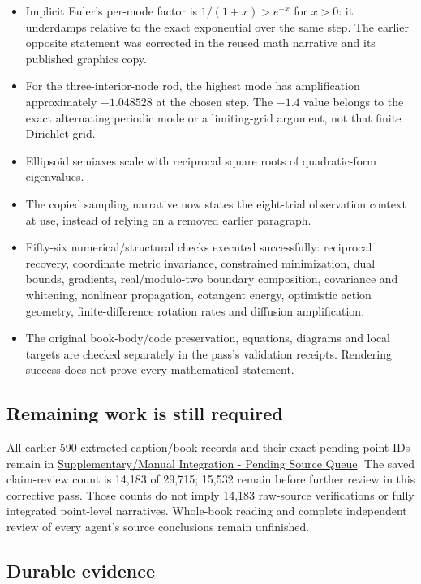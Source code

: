 \begin{itemize}
\tightlist
\item
  Implicit Euler's per-mode factor is \(1/(1+x)>e^{-x}\) for \(x>0\): it underdamps relative to the exact exponential over the same step. The earlier opposite statement was corrected in the reused math narrative and its published graphics copy.
\item
  For the three-interior-node rod, the highest mode has amplification approximately \(-1.048528\) at the chosen step. The \(-1.4\) value belongs to the exact alternating periodic mode or a limiting-grid argument, not that finite Dirichlet grid.
\item
  Ellipsoid semiaxes scale with reciprocal square roots of quadratic-form eigenvalues.
\item
  The copied sampling narrative now states the eight-trial observation context at use, instead of relying on a removed earlier paragraph.
\item
  Fifty-six numerical/structural checks executed successfully: reciprocal recovery, coordinate metric invariance, constrained minimization, dual bounds, gradients, real/modulo-two boundary composition, covariance and whitening, nonlinear propagation, cotangent energy, optimistic action geometry, finite-difference rotation rates and diffusion amplification.
\item
  The original book-body/code preservation, equations, diagrams and local targets are checked separately in the pass's validation receipts. Rendering success does not prove every mathematical statement.
\end{itemize}

\subsection{Remaining work is still required}\label{appendix-5056f3debc1f-remaining-work-is-still-required}

All earlier 590 extracted caption/book records and their exact pending point IDs remain in \hyperref[appendix-ac1f51db5e9a]{Supplementary/Manual Integration - Pending Source Queue}. The saved claim-review count is 14,183 of 29,715; 15,532 remain before further review in this corrective pass. Those counts do not imply 14,183 raw-source verifications or fully integrated point-level narratives. Whole-book reading and complete independent review of every agent's source conclusions remain unfinished.

\subsection{Durable evidence}\label{appendix-5056f3debc1f-durable-evidence}

